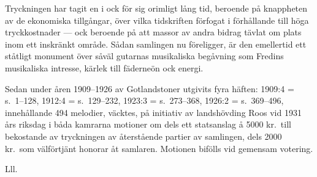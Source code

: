 \documentclass[a4paper,english]{article}
\begin{document}
\fussy
Tryckningen har tagit en i ock för sig orimligt lång tid, beroende
på knappheten av de ekonomiska tillgångar, över vilka tidskriften
förfogat i förhållande till höga tryckkostnader --- ock beroende på
att massor av andra bidrag tävlat om plats inom ett inskränkt område.
Sådan samlingen nu föreligger, är den emellertid ett ståtligt monument
över såväl gutarnas musikaliska begåvning som Fredins musikaliska
intresse, kärlek till fäderneön ock energi.

Sedan under åren 1909--1926 av \guillemotright{}Gotlandstoner\guillemotright{} utgivits fyra
häften: 1909:4 = s.\ 1--128, 1912:4 = s.\ 129--232, 1923:3 = s.\ 
273--368, 1926:2 = s.\ 369--496, innehållande 494 melodier, väcktes,
på initiativ av landshövding Roos vid 1931 års riksdag i båda
kamrarna motioner om dels ett statsanslag å 5000 kr.\ till bekostande
av tryckningen av återstående partier av samlingen, dels 2000 kr.\ 
som välförtjänt honorar åt samlaren. Motionen bifölls vid gemensam
votering.

Lll.
\end{document}

